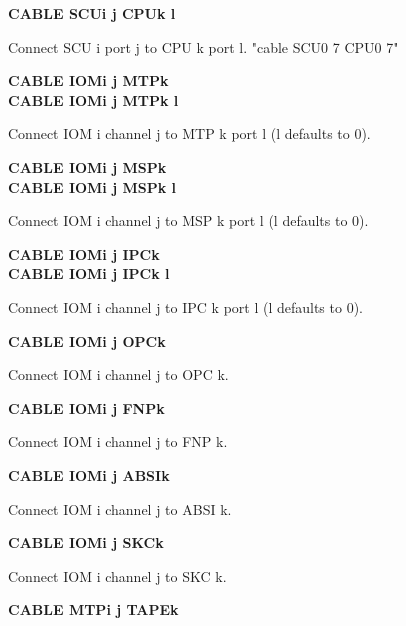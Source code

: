 \textbf{CABLE SCUi j CPUk l}

\begin{adjustwidth}{5ex}{1ex}
  Connect SCU i port j to CPU k port l.
  "cable SCU0 7 CPU0 7"
\end{adjustwidth}

\textbf{CABLE IOMi j MTPk} \\
\textbf{CABLE IOMi j MTPk l}

\begin{adjustwidth}{5ex}{1ex}
  Connect IOM i channel j to MTP k port l (l defaults to 0).
\end{adjustwidth}

\textbf{CABLE IOMi j MSPk} \\
\textbf{CABLE IOMi j MSPk l}

\begin{adjustwidth}{5ex}{1ex}
  Connect IOM i channel j to MSP k port l (l defaults to 0).
\end{adjustwidth}

\textbf{CABLE IOMi j IPCk} \\
\textbf{CABLE IOMi j IPCk l} \\

\begin{adjustwidth}{5ex}{1ex}
  Connect IOM i channel j to IPC k port l (l defaults to 0).
\end{adjustwidth}

\textbf{CABLE IOMi j OPCk}

\begin{adjustwidth}{5ex}{1ex}
  Connect IOM i channel j to OPC k.
\end{adjustwidth}

\textbf{CABLE IOMi j FNPk}

\begin{adjustwidth}{5ex}{1ex}
  Connect IOM i channel j to FNP k.
\end{adjustwidth}

\textbf{CABLE IOMi j ABSIk}

\begin{adjustwidth}{5ex}{1ex}
  Connect IOM i channel j to ABSI k.
\end{adjustwidth}

\textbf{CABLE IOMi j SKCk}

\begin{adjustwidth}{5ex}{1ex}
  Connect IOM i channel j to SKC k.
\end{adjustwidth}

\textbf{CABLE MTPi j TAPEk}

